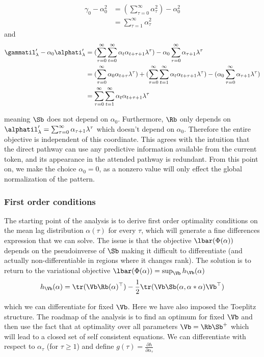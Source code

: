 \documentclass{article}
\begin{document}
\begin{align}
    \gamma_0 - \alpha_0^2 &= (\sum_{\tau=0}^\infty \alpha_\tau^2) - \alpha_0^2 \\
    &= \sum_{\tau=1}^\infty \alpha_\tau^2
\end{align}
 and 
\begin{align}
    \gammatil'_\lambda - \alpha_0\alphati'_\lambda &= (\sum_{\tau=0}^\infty\sum_{t=0}^\infty \alpha_t \alpha_{t+\tau+1}\lambda^\tau) - \alpha_0\sum_{\tau=0}^\infty \alpha_{\tau+1}\lambda^\tau \\
    &= (\sum_{\tau=0}^\infty\alpha_0 \alpha_{t+\tau}\lambda^\tau) + (\sum_{\tau=0}^\infty\sum_{t=1}^\infty \alpha_t \alpha_{t+\tau+1}\lambda^\tau) - ( \alpha_0\sum_{\tau=0}^\infty \alpha_{\tau+1}\lambda^\tau)\\
    &= \sum_{\tau=0}^\infty\sum_{t=1}^\infty \alpha_t \alpha_{t+\tau+1}\lambda^\tau
\end{align}

meaning $\Sb$ does not depend on $\alpha_0$. Furthermore, $\Rb$ only depends on $\alphatil'_\lambda = \sum_{\tau=0}^\infty \alpha_{\tau+1}\lambda^{\tau}$ which doesn't depend on $\alpha_0$. Therefore the entire objective is independent of this coordinate. This agrees with the intuition that the direct pathway can use any predictive information available from the current token, and its appearance in the attended pathway is redundant. From this point on, we make the choice $\alpha_0 = 0$, as a nonzero value will only effect the global normalization of the pattern. 

\subsubsection{First order conditions}
The starting point of the analysis is to derive first order optimality conditions on the mean lag distribution $\alpha(\tau)$ for every $\tau$, which will generate a fine differences expression that we can solve. The issue is that the objective $\lbar(\Phi(\alpha))$ depends on the pseudoinverse of $\Sb$ making it difficult to differentiate (and actually non-differentiable in regions where it changes rank). The solution is to return to the variational objective $\lbar(\Phi(\alpha)) = \sup_{\Vb} h_{\Vb}(\alpha)$ 
\begin{equation}
    h_{\Vb}(\alpha) = \tr(\Vb \Rb(\alpha)^\top) - \frac{1}{2}\tr(\Vb \Sb(\alpha, \alpha\ast\alpha)\Vb^\top)
\end{equation}

which we can differentiate for fixed $\Vb$. Here we have also imposed the Toeplitz structure. The roadmap of the analysis is to find an optimum for fixed $\Vb$ and then use the fact that at optimality over all parameters $\Vb = \Rb\Sb^+$ which will lead to a closed set of self consistent equations. We can differentiate with respect to $\alpha_\tau$ (for $\tau \ge 1$) and define $g(\tau) = \frac{\partial h}{\partial \alpha_\tau}$
\end{document}
